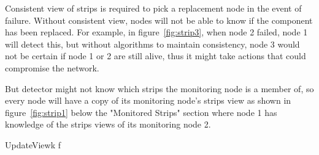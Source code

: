 Consistent view of strips is required to pick a replacement node in the event
of failure. Without consistent view, nodes will not be able to know if the
component has been replaced.
For example, in figure~\ref{fig:strip3}, when node 2 failed, node 1 will detect
this, but without algorithms to maintain consistency, node 3 would not be
certain if node 1 or 2 are still alive, thus it might take actions that could
compromise the network.

But detector might not know which strips the monitoring node is a member of, so
every node will have a copy of its monitoring node's strips view as shown in
figure~\ref{fig:strip1} below the "Monitored Strips" section where node 1 has
knowledge of the strips views of its monitoring node 2.

\begin{algorithm}
\label{alg:recovery}
\begin{pseudocode}{UpdateView}{k}
f 
\end{pseudocode}
\end{algorithm}

